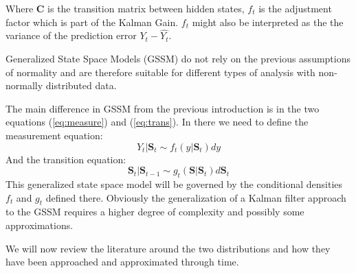 Where \textbf{C} is the transition matrix between hidden states, $f_t$ is the adjustment factor which is part of the Kalman Gain. $f_t$ might also be interpreted as the the variance of the prediction error $Y_t - \hat{Y_t}$.
\par \vspace{5mm}
Generalized State Space Models (GSSM) do not rely on the previous assumptions of normality and are therefore suitable for different types of analysis with non-normally distributed data.

The main difference in GSSM from the previous introduction is in the two equations (\ref{eq:measure}) and (\ref{eq:trans}). In there we need to define the measurement equation:
\begin{equation} \label{eq:gener_measure}
    Y_t|\textbf{S}_t \sim f_t(y|\textbf{S}_t) dy 
\end{equation}
And the transition equation:
\begin{equation} \label{eq:gener_trans}
    \textbf{S}_t|\textbf{S}_{t-1} \sim g_t(\textbf{S}|\textbf{S}_t) d\textbf{S}_t
\end{equation}
This generalized state space model will be governed by the conditional densities $f_t$ and $g_t$ defined there. Obviously the generalization of a Kalman filter approach to the GSSM requires a higher degree of complexity and possibly some approximations.

We will now review the literature around the two distributions and how they have been approached and approximated through time.
